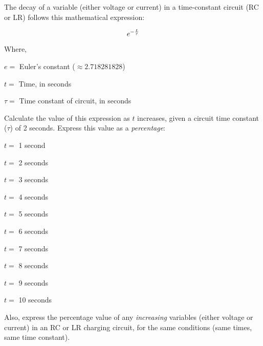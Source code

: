 

The decay of a variable (either voltage or current) in a time-constant circuit (RC or LR) follows this mathematical expression:

$$e^{-{t \over \tau}}$$

\noindent
Where,

$e =$ Euler's constant ($\approx 2.718281828$)

$t =$ Time, in seconds

$\tau =$ Time constant of circuit, in seconds

\vskip 10pt

Calculate the value of this expression as $t$ increases, given a circuit time constant ($\tau$) of 2 seconds.  Express this value as a {\it percentage}:

\medskip
\item{} $t =$ 1 second
\item{} $t =$ 2 seconds
\item{} $t =$ 3 seconds
\item{} $t =$ 4 seconds
\item{} $t =$ 5 seconds
\item{} $t =$ 6 seconds
\item{} $t =$ 7 seconds
\item{} $t =$ 8 seconds
\item{} $t =$ 9 seconds
\item{} $t =$ 10 seconds
\medskip

Also, express the percentage value of any {\it increasing} variables (either voltage or current) in an RC or LR charging circuit, for the same conditions (same times, same time constant).







